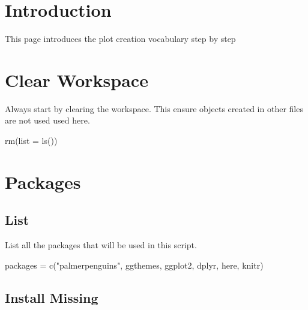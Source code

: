 \documentclass[
  letterpaper,
  DIV=11,
  numbers=noendperiod]{scrreprt}
\newenvironment{Shaded}{\begin{snugshade}}{\end{snugshade}}
\newcommand{\AttributeTok}[1]{\textcolor[rgb]{0.40,0.45,0.13}{#1}}
\newcommand{\FunctionTok}[1]{\textcolor[rgb]{0.28,0.35,0.67}{#1}}
\newcommand{\NormalTok}[1]{\textcolor[rgb]{0.00,0.23,0.31}{#1}}
\newcommand{\OtherTok}[1]{\textcolor[rgb]{0.00,0.23,0.31}{#1}}
\newcommand{\StringTok}[1]{\textcolor[rgb]{0.13,0.47,0.30}{#1}}
\begin{document}
\section{Introduction}\label{introduction}

This page introduces the plot creation vocabulary step by step

\section{Clear Workspace}\label{clear-workspace-1}

Always start by clearing the workspace. This ensure objects created in
other files are not used used here.

\begin{Shaded}
\begin{Highlighting}[]
\FunctionTok{rm}\NormalTok{(}\AttributeTok{list =} \FunctionTok{ls}\NormalTok{())}
\end{Highlighting}
\end{Shaded}

\section{Packages}\label{sec-packages}

\subsection{List}\label{list-1}

List all the packages that will be used in this script.

\begin{Shaded}
\begin{Highlighting}[]
\NormalTok{packages }\OtherTok{=} \FunctionTok{c}\NormalTok{(}\StringTok{"palmerpenguins"}\NormalTok{, }\StringTok{\textquotesingle{}ggthemes\textquotesingle{}}\NormalTok{, }\StringTok{\textquotesingle{}ggplot2\textquotesingle{}}\NormalTok{, }\StringTok{\textquotesingle{}dplyr\textquotesingle{}}\NormalTok{, }\StringTok{\textquotesingle{}here\textquotesingle{}}\NormalTok{, }\StringTok{\textquotesingle{}knitr\textquotesingle{}}\NormalTok{)}
\end{Highlighting}
\end{Shaded}

\subsection{Install Missing}\label{install-missing-1}
\end{document}
